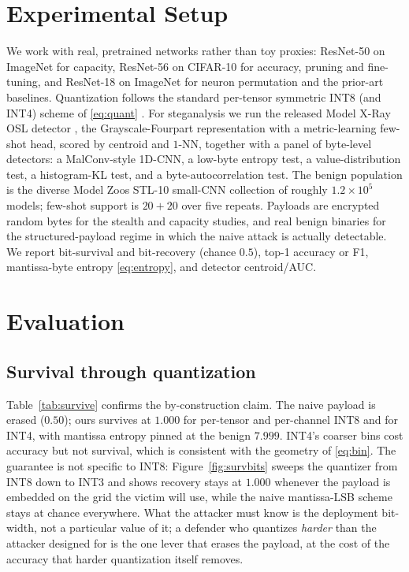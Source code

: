 \documentclass[10pt,journal]{IEEEtran}
\theoremstyle{remark}
\begin{document}
\section{Experimental Setup}\label{sec:setup}
We work with real, pretrained networks rather than toy proxies: ResNet-50
\cite{he2016resnet} on ImageNet \cite{deng2009imagenet} for capacity, ResNet-56 on
CIFAR-10 \cite{krizhevsky2009cifar} for accuracy, pruning and fine-tuning, and
ResNet-18 on ImageNet for neuron permutation and the prior-art baselines. Quantization
follows the standard per-tensor symmetric INT8 (and INT4) scheme of \eqref{eq:quant}
\cite{nagel2021whitepaper}.
For steganalysis we run the released Model X-Ray OSL detector
\cite{gilkarov2026modelxray}, the Grayscale-Fourpart representation with a
metric-learning few-shot head, scored by centroid and $1$-NN, together with a panel
of byte-level detectors: a MalConv-style 1D-CNN, a low-byte entropy test, a
value-distribution test, a histogram-KL test, and a byte-autocorrelation test. The
benign population is the diverse Model Zoos STL-10 small-CNN collection
\cite{schurholt2022modelzoos} of roughly $1.2\times10^{5}$ models; few-shot support is
$20{+}20$ over five repeats. Payloads are encrypted random
bytes for the stealth and capacity studies, and real benign binaries for the
structured-payload regime in which the naive attack is actually detectable. We report
bit-survival and bit-recovery (chance $0.5$), top-1 accuracy or F1, mantissa-byte
entropy \eqref{eq:entropy}, and detector centroid/AUC.

\section{Evaluation}\label{sec:eval}
\subsection{Survival through quantization}
Table~\ref{tab:survive} confirms the by-construction claim. The naive payload is erased
($0.50$); ours survives at $1.000$ for per-tensor and per-channel INT8 and for INT4,
with mantissa entropy pinned at the benign $7.999$. INT4's coarser bins cost accuracy
but not survival, which is consistent with the geometry of \eqref{eq:bin}. The guarantee
is not specific to INT8: Figure~\ref{fig:survbits} sweeps the quantizer from INT8 down to
INT3 and shows recovery stays at $1.000$ whenever the payload is embedded on the grid the
victim will use, while the naive mantissa-LSB scheme stays at chance everywhere. What the
attacker must know is the deployment bit-width, not a particular value of it; a defender
who quantizes \emph{harder} than the attacker designed for is the one lever that erases the
payload, at the cost of the accuracy that harder quantization itself removes.
\end{document}
